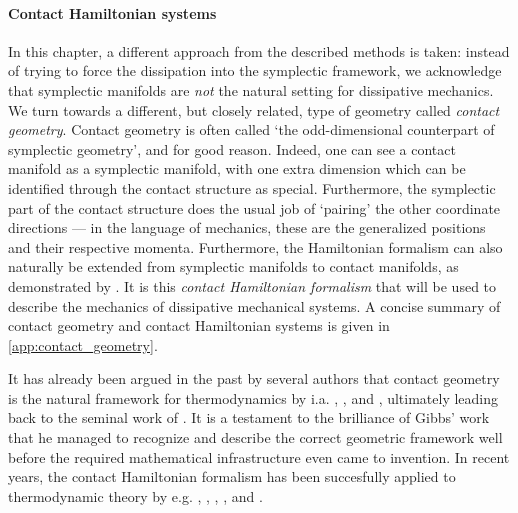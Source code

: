 \paragraph{Contact Hamiltonian systems} In this chapter, a different approach from the described methods is taken: instead of trying to force the dissipation into the symplectic framework, we acknowledge that symplectic manifolds are \emph{not} the natural setting for dissipative mechanics. We turn towards a different, but closely related, type of geometry called \emph{contact geometry}. Contact geometry is often called `the odd-dimensional counterpart of symplectic geometry', and for good reason. Indeed, one can see a contact manifold as a symplectic manifold, with one extra dimension which can be identified through the contact structure as special. Furthermore, the symplectic part of the contact structure does the usual job of `pairing' the other coordinate directions --- in the language of mechanics, these are the generalized positions and their respective momenta. Furthermore, the Hamiltonian formalism can also naturally be extended from symplectic manifolds to contact manifolds, as demonstrated by \citet{Arnold1989}. It is this \emph{contact Hamiltonian formalism} that will be used to describe the mechanics of dissipative mechanical systems. A concise summary of contact geometry and contact Hamiltonian systems is given in \cref{app:contact_geometry}.

It has already been argued in the past by several authors that contact geometry is the natural framework for thermodynamics by i.a. \citet{Arnold1991,Arnold1989a,Arnold1989,Arnold1989b}, \citet{Bamberg1988}, \citet{Burke1985} and \citet{Hermann1973}, ultimately leading back to the seminal work of \citet{Gibbs1873}. It is a testament to the brilliance of Gibbs' work that he managed to recognize and describe the correct geometric framework well before the required mathematical infrastructure even came to invention. \cite{Wightman1979} 
In recent years, the contact Hamiltonian formalism has been succesfully applied to thermodynamic theory by e.g. \citet{Mrugala1991}, \citet{Balian2001}, \citet{VanderSchaft2021a}, \citet{Bravetti2015}, and \citet{Simoes2020}. 


